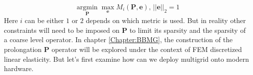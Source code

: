 \begin{equation}
\operatorname*{argmin}_{\mathbf{P}} \operatorname*{max}_{\mathbf{e}}M_i(\mathbf{P},\mathbf{e})\text{, }||\mathbf{e}||_2 = 1
\end{equation}
Here $i$ can be either $1$ or $2$ depends on which metric is used. But in reality other constraints will need to be imposed on $\mathbf{P}$ to limit its sparsity and the sparsity of a coarse level operator. In chapter \ref{Chapter:BBMG}, the construction of the prolongation $\mathbf{P}$ operator will be explored under the context of FEM discretized linear elasticity. But let's first examine how can we deploy multigrid onto modern hardware.
